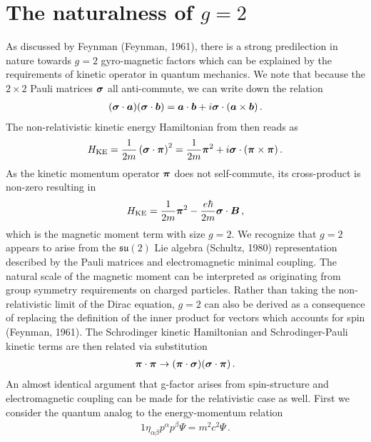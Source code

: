 \section{The naturalness of $g=2$}
\label{sec:nat}
As discussed by Feynman (Feynman, 1961), there is a strong predilection in nature towards $g=2$ gyro-magnetic factors which can be explained by the requirements of kinetic operator in quantum mechanics. We note that because the $2\times2$ Pauli matrices $\boldsymbol{\sigma}$ all anti-commute, we can write down the relation
\begin{alignat}{1}
	\label{nat:1} (\boldsymbol{\sigma}\cdot\boldsymbol{a})(\boldsymbol{\sigma}\cdot\boldsymbol{b})=\boldsymbol{a}\cdot\boldsymbol{b}+i\boldsymbol{\sigma}\cdot(\boldsymbol{a}\times\boldsymbol{b})\,.
\end{alignat}
The non-relativistic kinetic energy Hamiltonian from  then reads as
\begin{alignat}{1}
	\label{nat:2} {H}_{\mathrm{KE}}=\frac{1}{2m}\left(\boldsymbol{\sigma}\cdot\boldsymbol{\pi}\right)^{2}=\frac{1}{2m}\boldsymbol{\pi}^{2}+i\boldsymbol{\sigma}\cdot(\boldsymbol{\pi}\times\boldsymbol{\pi})\,.
\end{alignat}
As the kinetic momentum operator $\boldsymbol{\pi}$ does not self-commute, its cross-product is non-zero resulting in
\begin{alignat}{1}
	\label{nat:3} {H}_{\mathrm{KE}}=\frac{1}{2m}\boldsymbol{\pi}^{2}-\frac{e\hbar}{2m}\boldsymbol{\sigma}\cdot\boldsymbol{B}\,,
\end{alignat}
which is the magnetic moment term with size $g=2$. We recognize that $g=2$ appears to arise from the $\mathfrak{su}(2)$ Lie algebra (Schultz, 1980) representation described by the Pauli matrices and electromagnetic minimal coupling. The natural scale of the magnetic moment can be interpreted as originating from group symmetry requirements on charged particles. Rather than taking the non-relativistic limit of the Dirac equation, $g=2$ can also be derived as a consequence of replacing the definition of the inner product for vectors which accounts for spin (Feynman, 1961). The Schrodinger kinetic Hamiltonian and Schrodinger-Pauli kinetic terms are then related via substitution
\begin{alignat}{1}
	\label{nat:4} \boldsymbol{\pi}\cdot\boldsymbol{\pi} \rightarrow (\boldsymbol{\pi}\cdot\boldsymbol{\sigma})(\boldsymbol{\sigma}\cdot\boldsymbol{\pi})\,.
\end{alignat}
An almost identical argument that g-factor arises from spin-structure and electromagnetic coupling can be made for the relativistic case as well. First we consider the quantum analog to the energy-momentum relation
\begin{alignat}{1}
	\label{analog:1} \eta_{\alpha\beta}p^{\alpha}p^{\beta}\Psi=m^{2}c^{2}\Psi\,.
\end{alignat}
